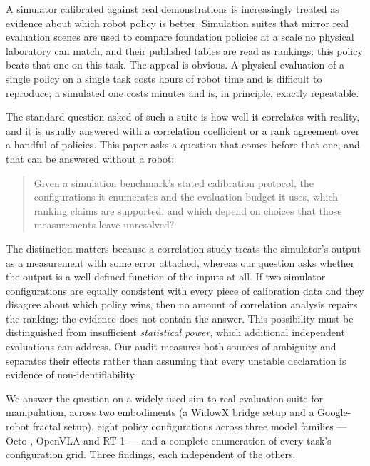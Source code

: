 \documentclass[pdflatex,iicol,sn-apa]{sn-jnl}
\theoremstyle{remark}
\begin{document}
A simulator calibrated against real demonstrations is increasingly treated as evidence about which
robot policy is better. Simulation suites that mirror real evaluation scenes
\citep{li2024simpler} are used to compare foundation policies at a scale no physical laboratory can
match, and their published tables are read as rankings: this policy beats that one on this task.
The appeal is obvious. A physical evaluation of a single policy on a single task costs hours of
robot time and is difficult to reproduce; a simulated one costs minutes and is, in principle,
exactly repeatable.

The standard question asked of such a suite is how well it correlates with reality, and it is
usually answered with a correlation coefficient or a rank agreement over a handful of policies.
This paper asks a question that comes before that one, and that can be answered without a robot:

\begin{quote}
Given a simulation benchmark's stated calibration protocol, the configurations it enumerates and
the evaluation budget it uses, which ranking claims are supported, and which depend on choices
that those measurements leave unresolved?
\end{quote}

The distinction matters because a correlation study treats the simulator's output as a measurement
with some error attached, whereas our question asks whether the output is a well-defined function
of the inputs at all. If two simulator configurations are equally consistent with every piece of
calibration data and they disagree about which policy wins, then no amount of correlation analysis
repairs the ranking: the evidence does not contain the answer. This possibility must be distinguished
from insufficient \emph{statistical power}, which additional independent evaluations can address.
Our audit measures both sources of ambiguity and separates their effects rather than assuming
that every unstable declaration is evidence of non-identifiability.

We answer the question on a widely used sim-to-real evaluation suite for manipulation, across two
embodiments (a WidowX bridge setup and a Google-robot fractal setup), eight policy configurations
across three model families --- Octo \citep{octo2024}, OpenVLA \citep{kim2024openvla} and RT-1
\citep{brohan2023rt1} --- and a complete enumeration of every task's configuration grid. Three
findings, each independent of the others.
\end{document}
